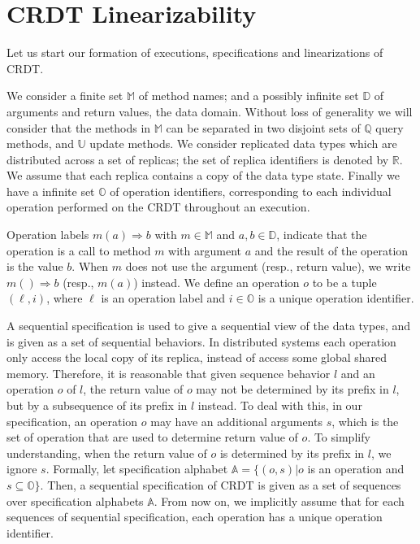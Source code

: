 
\section{CRDT Linearizability}
\label{sec:crdt-lin}

Let us start our formation of executions, specifications and linearizations of CRDT.

We consider a finite set $\mathbb{M}$ of method names; and a possibly infinite set $\mathbb{D}$ of arguments and return values, the data domain. Without loss of generality we will consider that the methods in $\mathbb{M}$ can be separated in two disjoint sets of $\mathbb{Q}$ query methods, and $\mathbb{U}$ update methods. 
We consider replicated data types which are distributed across a set of replicas; the set of replica identifiers is denoted by $\mathbb{R}$. We assume that each replica contains a copy of the data type state. Finally we have a infinite set $\mathbb{O}$ of operation identifiers, corresponding to each individual operation performed on the CRDT throughout an execution.

Operation labels \mbox{$m(a)\Rightarrow b$} with $m \in \mathbb{M}$ and $a,b \in \mathbb{D}$, indicate that the operation is a call to method $m$ with argument $a$ and the result of the operation is the value $b$. When $m$ does not use the argument (resp., return value), we write $m()\Rightarrow b$ (resp., $m(a)$) instead. We define an operation $o$ to be a tuple $(\ell,i)$, where $\ell$ is an operation label and $i \in \mathbb{O}$ is a unique operation identifier.

 A sequential specification is used to give a sequential view of the data types, and is given as a set of sequential behaviors. In distributed systems each operation only access the local copy of its replica, instead of access some global shared memory. Therefore, it is reasonable that given sequence behavior $l$ and an operation $o$ of $l$, the return value of $o$ may not be determined by its prefix in $l$, but by a subsequence of its prefix in $l$ instead. To deal with this, in our specification, an operation $o$ may have an additional arguments $s$, which is the set of operation that are used to determine return value of $o$. To simplify understanding, when the return value of $o$ is determined by its prefix in $l$, we ignore $s$. Formally, let specification alphabet $\mathbb{A}= \{ (o,s) \vert o$ is an operation and $s \subseteq \mathbb{O} \}$. Then, a sequential specification of CRDT is given as a set of sequences over specification alphabets $\mathbb{A}$. From now on, we implicitly assume that for each sequences of sequential specification, each operation has a unique operation identifier.

